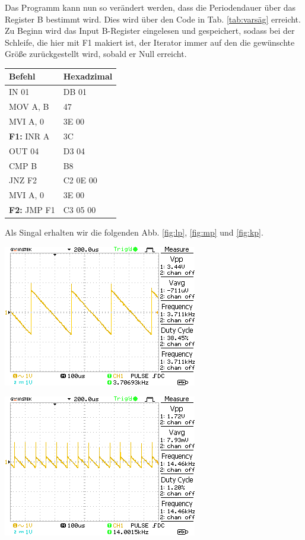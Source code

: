 \documentclass[10pt]{article}
\newenvironment{Figure}
  {\par\medskip\noindent\minipage{\linewidth}}
  {\endminipage\par\medskip}
\begin{document}
\begin{multicols}{2}
  Das Programm kann nun so verändert werden, dass die Periodendauer über das Register B bestimmt wird. Dies wird über den Code in Tab. \ref{tab:varsäg} erreicht. Zu Beginn wird das Input B-Register eingelesen und gespeichert, sodass bei der Schleife, die hier mit F1 makiert ist, der Iterator immer auf den die gewünschte Größe zurückgestellt wird, sobald er Null erreicht.
	\begin{center}
		\begin{tabular}{|l|l|}
			\hline
			\textbf{Befehl}     & \textbf{Hexadzimal} \\
			\hline
			IN 01               & DB 01               \\
			MOV A, B            & 47                  \\
			MVI A, 0            & 3E 00               \\
			\textbf{F1:} INR A  & 3C                  \\
			OUT 04              & D3 04               \\
			CMP B               & B8                  \\
			JNZ F2              & C2 0E 00            \\
			MVI A, 0            & 3E 00               \\
			\textbf{F2:} JMP F1 & C3 05 00            \\
			\hline
		\end{tabular}
    \label{tab:varsäg}
	\end{center}
  Als Singal erhalten wir die folgenden Abb. \ref{fig:lp}, \ref{fig:mp} und \ref{fig:kp}.
\begin{Figure}
  \centering\includegraphics{../data/DS0008.png}
  \label{fig:lp}
\end{Figure}
\begin{Figure}
  \centering\includegraphics{../data/DS0009.png}

\end{Figure}
\end{multicols}
\end{document}
